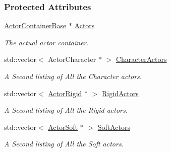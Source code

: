 \subsubsection*{Protected Attributes}
\begin{DoxyCompactItemize}
\item 
\hypertarget{classMezzanine_1_1ActorManager_a3b5ef9469c6e000aa0735d9a7fbeda5f}{
\hyperlink{classMezzanine_1_1ActorContainerBase}{ActorContainerBase} $\ast$ \hyperlink{classMezzanine_1_1ActorManager_a3b5ef9469c6e000aa0735d9a7fbeda5f}{Actors}}
\label{classMezzanine_1_1ActorManager_a3b5ef9469c6e000aa0735d9a7fbeda5f}

\begin{DoxyCompactList}\small\item\em The actual actor container. \item\end{DoxyCompactList}\item 
\hypertarget{classMezzanine_1_1ActorManager_a07fba4f64f1a9162d3a12916d6ef29bd}{
std::vector$<$ ActorCharacter $\ast$ $>$ \hyperlink{classMezzanine_1_1ActorManager_a07fba4f64f1a9162d3a12916d6ef29bd}{CharacterActors}}
\label{classMezzanine_1_1ActorManager_a07fba4f64f1a9162d3a12916d6ef29bd}

\begin{DoxyCompactList}\small\item\em A Second listing of All the Character actors. \item\end{DoxyCompactList}\item 
\hypertarget{classMezzanine_1_1ActorManager_a1283d3955dc83831c7687573b6cff206}{
std::vector$<$ \hyperlink{classMezzanine_1_1ActorRigid}{ActorRigid} $\ast$ $>$ \hyperlink{classMezzanine_1_1ActorManager_a1283d3955dc83831c7687573b6cff206}{RigidActors}}
\label{classMezzanine_1_1ActorManager_a1283d3955dc83831c7687573b6cff206}

\begin{DoxyCompactList}\small\item\em A Second listing of All the Rigid actors. \item\end{DoxyCompactList}\item 
\hypertarget{classMezzanine_1_1ActorManager_ad3a985b2087fc1353f7d33485589207b}{
std::vector$<$ \hyperlink{classMezzanine_1_1ActorSoft}{ActorSoft} $\ast$ $>$ \hyperlink{classMezzanine_1_1ActorManager_ad3a985b2087fc1353f7d33485589207b}{SoftActors}}
\label{classMezzanine_1_1ActorManager_ad3a985b2087fc1353f7d33485589207b}

\begin{DoxyCompactList}\small\item\em A Second listing of All the Soft actors. \item\end{DoxyCompactList}\end{DoxyCompactItemize}


